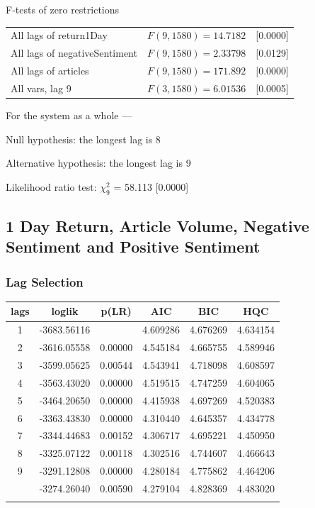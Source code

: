 \begin{center}
F-tests of zero restrictions\\[1em]
\begin{tabular}{lll}
All lags of return1Day & $F(9, 1580) = 14.7182$ & [0.0000]\\
All lags of negativeSentiment & $F(9, 1580) = 2.33798$ & [0.0129]\\
All lags of articles & $F(9, 1580) = 171.892$ & [0.0000]\\
All vars, lag 9 & $F(3, 1580) = 6.01536$ & [0.0005]\\
\end{tabular}
\end{center}

\noindent For the system as a whole ---\par
Null hypothesis: the longest lag is 8\par
Alternative hypothesis: the longest lag is 9\par
Likelihood ratio test: $\chi^2_{9}$ = 58.113 [0.0000]\par    

\subsection{1 Day Return, Article Volume, Negative Sentiment and Positive Sentiment}

\subsubsection{Lag Selection}

\begin{center}
\begin{tabular}{ c c c c c c }
lags & loglik & p(LR) & AIC & BIC & HQC \\
\hline
1 & -3683.56116 & & 4.609286 & 4.676269 & 4.634154 \\
2 & -3616.05558 & 0.00000 & 4.545184 & 4.665755 & 4.589946 \\
3 & -3599.05625 & 0.00544 & 4.543941 & 4.718098 & 4.608597 \\
4 & -3563.43020 & 0.00000 & 4.519515 & 4.747259 & 4.604065 \\
5 & -3464.20650 & 0.00000 & 4.415938 & 4.697269 & 4.520383 \\
6 & -3363.43830 & 0.00000 & 4.310440 & 4.645357 & 4.434778 \\
7 & -3344.44683 & 0.00152 & 4.306717 & 4.695221 & 4.450950 \\
8 & -3325.07122 & 0.00118 & 4.302516 & 4.744607 & 4.466643 \\
9 & -3291.12808 & 0.00000 & 4.280184 & 4.775862 & 4.464206 \\
\arrayrulecolor{red}\hline
10 & -3274.26040 & 0.00590 & 4.279104 & 4.828369 & 4.483020 \\
\arrayrulecolor{red}\hline
\end{tabular}
\end{center}

